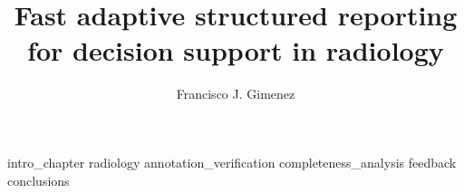 \documentclass[12pt,twoside]{report}		%
\title{Fast adaptive structured reporting for decision support in radiology}
\author{Francisco J. Gimenez}
\begin{document}
\beforepreface						%



\ifproposal 						%
\else 
	 
\fi	


{ \hypersetup{hidelinks}			%
  \contentstablesfigures }			%
\startmaindoc						%


{intro_chapter}
{radiology}
{annotation_verification}
{completeness_analysis}
{feedback}
{conclusions}




%

\end{document}
